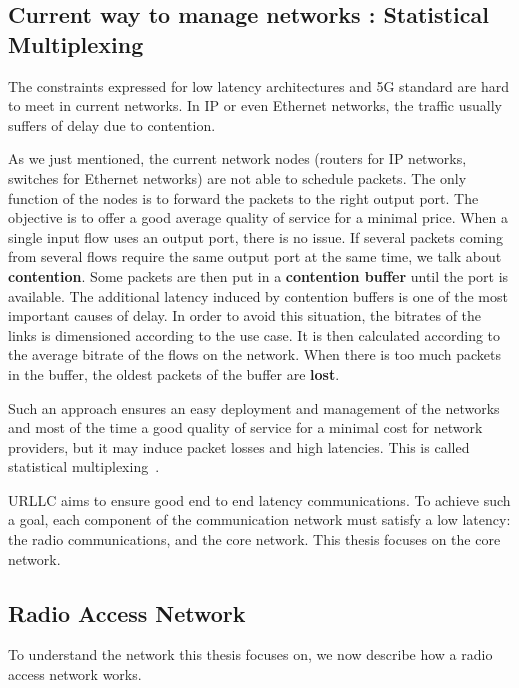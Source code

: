 \subsection{Current way to manage networks : Statistical Multiplexing}


The constraints expressed for low latency architectures and 5G standard are hard to meet in current networks. In IP or even Ethernet networks, the traffic usually suffers of delay due to contention. 

As we just mentioned, the current network nodes (routers for IP networks, switches for Ethernet networks) are not able to schedule packets. The only function of the nodes is to forward the packets to the right output port.
The objective is to offer a good average quality of service for a minimal price. When a single input flow uses an output port, there is no issue.
 If several packets coming from several flows require the same output port at the same time, we talk about \textbf{contention}. Some packets are then put in a \textbf{contention buffer} until the port is available. The additional latency induced by contention buffers is one of the most important causes of delay. In order to avoid this situation, the bitrates of the links is dimensioned according to the use case. It is then calculated according to the average bitrate of the flows on the network. 
 When there is too much packets in the buffer, the oldest packets of the buffer are \textbf{lost}. 

Such an approach ensures an easy deployment and management of the networks and most of the time a good quality of service for a minimal cost for network providers, but it may induce packet losses and high latencies. This is called statistical multiplexing~\cite{krishnamurthy2003latency,venkatramani1994supporting}. 

URLLC aims to ensure good end to end latency communications. To achieve such a goal, each component of the communication network must satisfy a low latency: the radio communications, and the core network. This thesis focuses on the core network. 

\subsection{\textbf{R}adio \textbf{A}ccess \textbf{N}etwork}

To understand the network this thesis focuses on, we now describe how a radio access network works.


